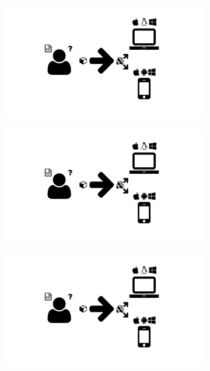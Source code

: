 \begin{figure}
  \centering
  \begin{subfigure}[t]{0.3\textwidth}
    \includegraphics[width=\textwidth,page=18,trim=8.5cm 0cm 9cm 0cm, clip=true]{images/Figures.pdf}
    \caption{}
    \label{Figure:tidal-output-heatmap}
  \end{subfigure}
  \begin{subfigure}[t]{.66\textwidth}
    \includegraphics[width=\textwidth,page=19]{images/Figures.pdf}
    \caption{}
    \label{Figure:tidal-output-table}
  \end{subfigure}
  \begin{subfigure}[b]{\textwidth}
    \includegraphics[width=\textwidth,page=20,trim=0.37cm .65cm 0.37cm 0.3cm, clip=true]{images/Figures.pdf}
    \caption{}
    \label{Figure:tidal-output-graphene}
  \end{subfigure}
  \caption{}
  \label{Figure:tidal-output}
\end{figure}

